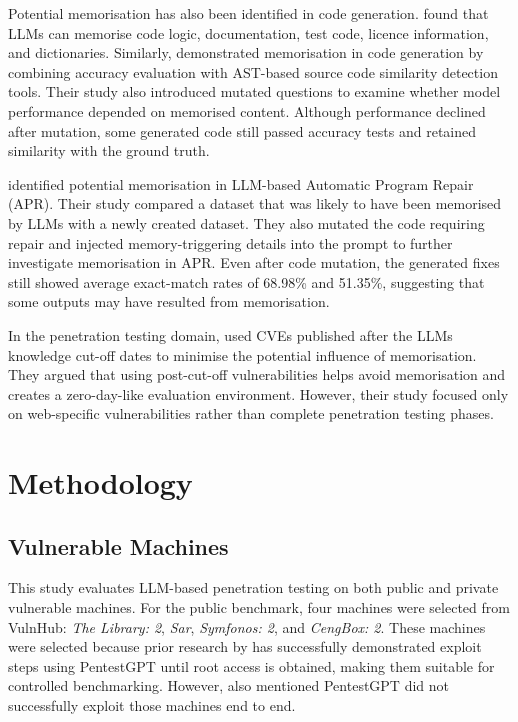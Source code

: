 \documentclass[acmtog]{acmart}
\begin{document}
Potential memorisation has also been identified in code generation. \citet{al_traces} found that LLMs can memorise code logic, documentation, test code, licence information, and dictionaries. Similarly, \citet{chen_memorize_2025} demonstrated memorisation in code generation by combining accuracy evaluation with AST-based source code similarity detection tools. Their study also introduced mutated questions to examine whether model performance depended on memorised content. Although performance declined after mutation, some generated code still passed accuracy tests and retained similarity with the ground truth.

\citet{kong_demystifying_2025} identified potential memorisation in LLM-based Automatic Program Repair (APR). Their study compared a dataset that was likely to have been memorised by LLMs with a newly created dataset. They also mutated the code requiring repair and injected memory-triggering details into the prompt to further investigate memorisation in APR. Even after code mutation, the generated fixes still showed average exact-match rates of 68.98\% and 51.35\%, suggesting that some outputs may have resulted from memorisation.

In the penetration testing domain, \citet{zhu_teams_2025} used CVEs published after the LLMs knowledge cut-off dates to minimise the potential influence of memorisation. They argued that using post-cut-off vulnerabilities helps avoid memorisation and creates a zero-day-like evaluation environment. However, their study focused only on web-specific vulnerabilities rather than complete penetration testing phases.


\section{Methodology}

\subsection{Vulnerable Machines}

This study evaluates LLM-based penetration testing on both public and private vulnerable machines. For the public benchmark, four machines were selected from VulnHub: \textit{The Library: 2}, \textit{Sar}, \textit{Symfonos: 2}, and \textit{CengBox: 2}. These machines were selected because prior research by \citet{isozaki_towards_2025} has successfully demonstrated  exploit steps using PentestGPT until root access is obtained, making them suitable for controlled benchmarking. However, \citet{isozaki_towards_2025} also mentioned PentestGPT did not successfully exploit those machines end to end.
\end{document}

